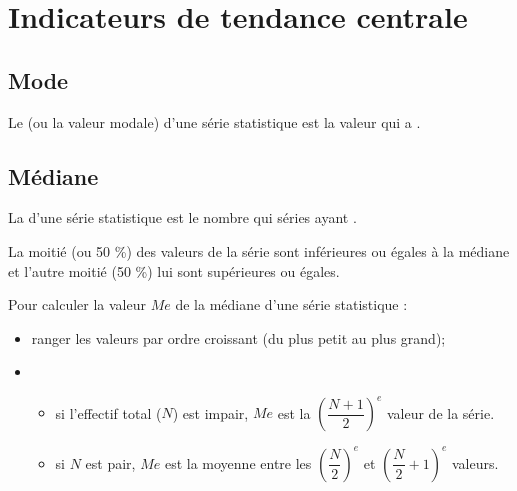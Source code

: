 \documentclass[12pt,a4paper]{article}
\date{}
\title{}
\begin{document}
{}

\section{Indicateurs de tendance centrale}


\subsection{Mode}
\begin{mydef}
	Le  (ou la valeur modale) d'une série statistique est la valeur qui a .
\end{mydef}





\subsection{Médiane}

\begin{mydef}
	La  d'une série statistique est le nombre qui  séries ayant .
	
	La moitié (ou 50 \%)  des valeurs de la série sont inférieures ou égales à la médiane et l'autre moitié (50 \%) lui sont supérieures ou égales.
\end{mydef}

\begin{mymeth}
	Pour calculer la valeur $Me$ de la médiane d'une série statistique :
	\begin{itemize}
		\item ranger les valeurs par ordre croissant (du plus petit au plus grand);
		\item \begin{itemize}
			\item si l'effectif total ($N$) est impair, $Me$ est la $ \left( \dfrac{N+1}{2}\right)  ^e$ valeur de la série.
			\item si $N$ est pair, $Me$ est la moyenne entre les $\left(\dfrac{N}{2}\right)^e$ et  $\left(\dfrac{N}{2} + 1\right)^e$ valeurs.
			
		\end{itemize}
	\end{itemize}
\end{mymeth}
\end{document}
